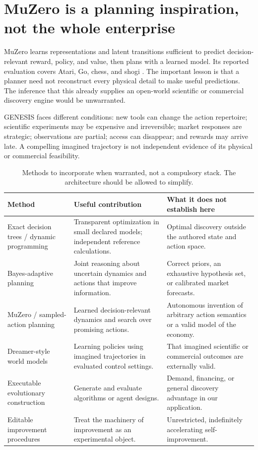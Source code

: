 \documentclass[11pt,letterpaper]{article}
\theoremstyle{remark}\newtheorem{remark}{Remark}[section]
\begin{document}
\section{MuZero is a planning inspiration, not the whole enterprise}\label{sec:muzero}
MuZero learns representations and latent transitions sufficient to predict decision-relevant reward, policy, and value, then plans with a learned model. Its reported evaluation covers Atari, Go, chess, and shogi \citep{muzero2020}. The important lesson is that a planner need not reconstruct every physical detail to make useful predictions. The inference that this already supplies an open-world scientific or commercial discovery engine would be unwarranted.

GENESIS faces different conditions: new tools can change the action repertoire; scientific experiments may be expensive and irreversible; market responses are strategic; observations are partial; access can disappear; and rewards may arrive late. A compelling imagined trajectory is not independent evidence of its physical or commercial feasibility.

\begin{table}[H]
\caption{Methods to incorporate when warranted, not a compulsory stack. The architecture should be allowed to simplify.}
\small
\begin{tabularx}{\linewidth}{P{3.0cm}YY}
\toprule
\textbf{Method}&\textbf{Useful contribution}&\textbf{What it does not establish here}\\
\midrule
Exact decision trees / dynamic programming & Transparent optimization in small declared models; independent reference calculations. & Optimal discovery outside the authored state and action space.\\
Bayes-adaptive planning \citep{bayesadaptive2007} & Joint reasoning about uncertain dynamics and actions that improve information. & Correct priors, an exhaustive hypothesis set, or calibrated market forecasts.\\
MuZero / sampled-action planning \citep{muzero2020,sampledmuzero2021} & Learned decision-relevant dynamics and search over promising actions. & Autonomous invention of arbitrary action semantics or a valid model of the economy.\\
Dreamer-style world models \citep{dreamer2025} & Learning policies using imagined trajectories in evaluated control settings. & That imagined scientific or commercial outcomes are externally valid.\\
Executable evolutionary construction \citep{alphaevolve2025,adas2024} & Generate and evaluate algorithms or agent designs. & Demand, financing, or general discovery advantage in our application.\\
Editable improvement procedures \citep{dgm2025,hyperagents2026} & Treat the machinery of improvement as an experimental object. & Unrestricted, indefinitely accelerating self-improvement.\\
\bottomrule
\end{tabularx}
\end{table}
\end{document}
